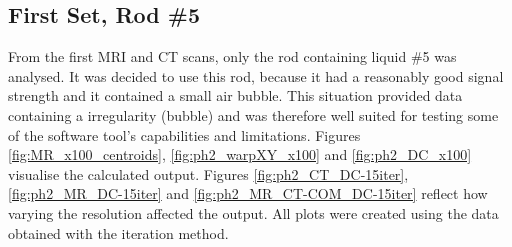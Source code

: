 \subsection{First Set, Rod \#5}

From the first MRI and CT scans, only the rod containing liquid \#5 was analysed.
It was decided to use this rod, because it had a reasonably good signal strength and it contained a small air bubble.
This situation provided data containing a irregularity (bubble) and was therefore well suited for testing some of the software tool's capabilities and limitations.
Figures \ref{fig:MR_x100_centroids}, \ref{fig:ph2_warpXY_x100} and \ref{fig:ph2_DC_x100} visualise the calculated output.
Figures \ref{fig:ph2_CT_DC-15iter},  \ref{fig:ph2_MR_DC-15iter} and \ref{fig:ph2_MR_CT-COM_DC-15iter} reflect how varying the resolution affected the output.
All plots were created using the data obtained with the iteration method.

